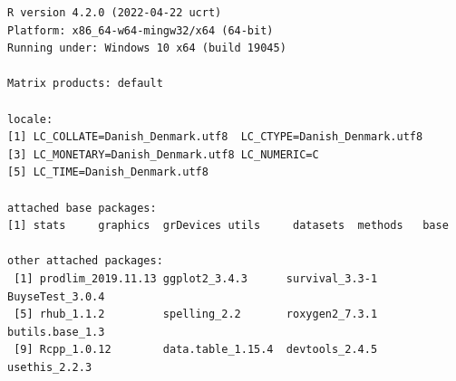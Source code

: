 \documentclass[12pt]{article}
\begin{document}
\begin{verbatim}
R version 4.2.0 (2022-04-22 ucrt)
Platform: x86_64-w64-mingw32/x64 (64-bit)
Running under: Windows 10 x64 (build 19045)

Matrix products: default

locale:
[1] LC_COLLATE=Danish_Denmark.utf8  LC_CTYPE=Danish_Denmark.utf8   
[3] LC_MONETARY=Danish_Denmark.utf8 LC_NUMERIC=C                   
[5] LC_TIME=Danish_Denmark.utf8    

attached base packages:
[1] stats     graphics  grDevices utils     datasets  methods   base     

other attached packages:
 [1] prodlim_2019.11.13 ggplot2_3.4.3      survival_3.3-1     BuyseTest_3.0.4   
 [5] rhub_1.1.2         spelling_2.2       roxygen2_7.3.1     butils.base_1.3   
 [9] Rcpp_1.0.12        data.table_1.15.4  devtools_2.4.5     usethis_2.2.3     


\end{verbatim}
\end{document}
